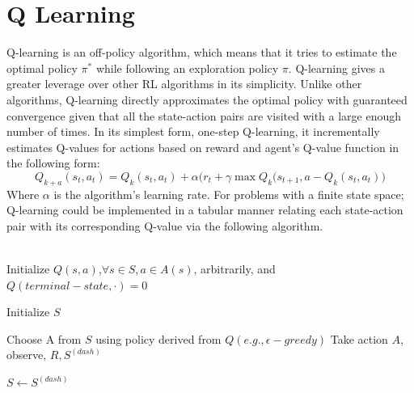 \section{Q Learning}
\label{sec:q_learning}
Q-learning is an off-policy algorithm, which means that it tries to estimate the optimal policy \(\pi^*\) while following an exploration policy \(\pi\).\cite{rl_state_of_the_art} Q-learning gives a greater leverage over other RL algorithms in its simplicity. Unlike other algorithms, Q-learning directly approximates the optimal policy with guaranteed convergence given that all the state-action pairs are visited with a large enough number of times. In its simplest form, one-step Q-learning, it incrementally estimates Q-values for actions based on reward and agent’s Q-value function in the following form:
\begin{equation}
    Q_{k+a}(s_t,a_t)=Q_k(s_t,a_t)+\alpha \Big(r_t+\gamma \max{Q_k(s_{t+1},a}-Q_k(s_t,a_t)\Big)
\end{equation}
Where \(\alpha\) is the algorithm's learning rate. 
For problems with a finite state space; Q-learning could be implemented in a tabular manner relating each state-action pair with its corresponding Q-value via the following algorithm.\cite{sutton}
\\ \\
\begin{algorithm}[H]
    \SetAlgoLined
    Initialize $Q(s, a)$,$ \forall  s \in S,a \in A(s)$, arbitrarily, and $Q(terminal-state, ·) = 0$\;
    {
    Initialize \(S\)\;
    {
    Choose A from $S$ using policy derived from $Q (e.g., \epsilon-greedy)$\;
    Take action $A$, observe, $R, S^(dash)$\;

    $S \gets S^(dash)$\
    }
    }
    \caption{Q learning algorithm}
\end{algorithm}